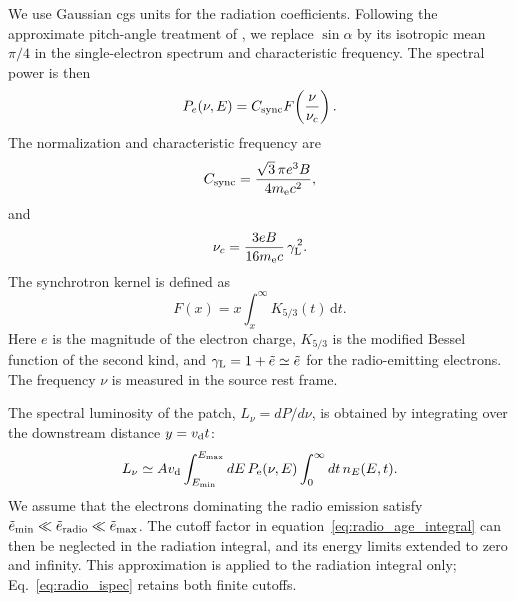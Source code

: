 We use Gaussian cgs units for the radiation coefficients.
Following the approximate pitch-angle treatment of
\citet{HoeftBruggen2007}, we replace $\sin\alpha$ by its isotropic
mean $\pi/4$ in the single-electron spectrum and characteristic
frequency. The spectral power is then
\begin{equation}
P_e(\nu,E)
=
C_{\rm sync}
F\!\left(\frac{\nu}{\nu_c}\right).
\label{eq:radio_single_electron}
\end{equation}
The normalization and characteristic frequency are
\begin{equation}
C_{\rm sync}
=
\frac{\sqrt{3}\,\pi e^3 B}{4m_{\rm e}c^2},
\label{eq:radio_csync}
\end{equation}
and
\begin{equation}
\nu_c
=
\frac{3eB}{16m_{\rm e}c}\,
\gamma_{\rm L}^{\,2}.
\label{eq:radio_nuc}
\end{equation}
The synchrotron kernel is defined as
\begin{equation}
F(x)
=
x\int_x^\infty K_{5/3}(t)\,\mathrm{d}t.
\label{eq:radio_kernel}
\end{equation}
Here $e$ is the magnitude of the electron charge,
$K_{5/3}$ is the modified Bessel function of the second kind,
and $\gamma_{\rm L}=1+\tilde e\simeq\tilde e$ for the
radio-emitting electrons. The frequency $\nu$ is measured in
the source rest frame.

The spectral luminosity of the patch, $L_\nu=dP/d\nu$, is
obtained by integrating over the downstream distance
$y=v_{\rm d}t$:
\begin{equation}
L_\nu\simeq A v_{\rm d}
\int_{E_{\min}}^{E_{\max}} dE\,P_{\rm e}(\nu,E)
\int_0^\infty dt\,n_E(E,t).
\label{eq:radio_downstream_integral}
\end{equation}
We assume that the electrons dominating the radio emission satisfy
$\tilde e_{\min}\ll\tilde e_{\rm radio}\ll\tilde e_{\max}$.
The cutoff factor in equation~\eqref{eq:radio_age_integral}
can then be neglected in the radiation integral, and its energy
limits extended to zero and infinity. This approximation is
applied to the radiation integral only; Eq.~\eqref{eq:radio_ispec}
retains both finite cutoffs.

